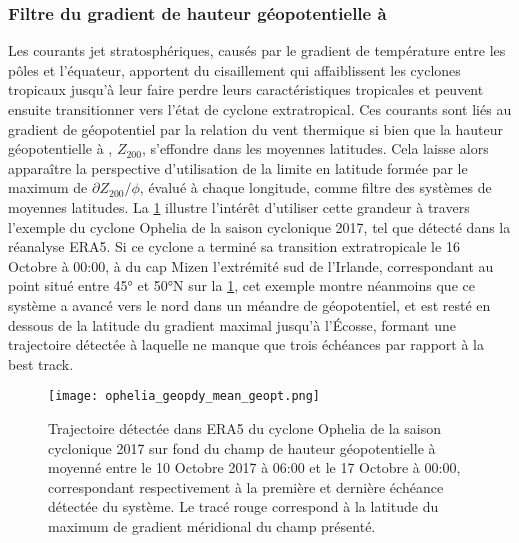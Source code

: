 \documentclass[../main.tex]{subfiles}
\begin{document}
\subsubsection*{Filtre du gradient de hauteur géopotentielle à }

Les courants jet stratosphériques, causés par le gradient de température entre les pôles et l'équateur, apportent du cisaillement qui affaiblissent les cyclones
tropicaux jusqu'à leur faire perdre leurs caractéristiques tropicales et peuvent ensuite transitionner vers l'état de cyclone extratropical. Ces courants sont
liés au gradient de géopotentiel par la relation du vent thermique si bien que la hauteur géopotentielle à , $Z_{200}$, s'effondre dans les moyennes
latitudes. Cela laisse alors apparaître la perspective d'utilisation de la limite en latitude formée par le maximum de $\partial Z_{200} / \phi$, évalué à
chaque longitude, comme filtre des systèmes de moyennes latitudes. La \cref{fig:ophelia_z200} illustre l'intérêt d'utiliser cette grandeur à travers l'exemple
du cyclone Ophelia de la saison cyclonique 2017, tel que détecté dans la réanalyse ERA5. Si ce cyclone a terminé sa transition extratropicale le 16 Octobre à
00:00, à  du cap Mizen l'extrémité sud de l'Irlande, correspondant au point situé entre \ang{45} et \ang{50}N sur la \cref{fig:ophelia_z200}, cet
exemple montre néanmoins que ce système a avancé vers le nord dans un méandre de géopotentiel, et est resté en dessous de la latitude du gradient maximal
jusqu'à l'Écosse, formant une trajectoire détectée à laquelle ne manque que trois échéances par rapport à la best track.

\begin{figure}[htpb]
    \centering
    \texttt{[image: ophelia\_geopdy\_mean\_geopt.png]}
    \caption{Trajectoire détectée dans ERA5 du cyclone Ophelia de la saison cyclonique 2017 sur fond du champ de hauteur géopotentielle à  moyenné
    entre le 10 Octobre 2017 à 06:00 et le 17 Octobre à 00:00, correspondant respectivement à la première et dernière échéance détectée du système. Le tracé
    rouge correspond à la latitude du maximum de gradient méridional du champ présenté.}
    \label{fig:ophelia_z200}
\end{figure}
\end{document}
